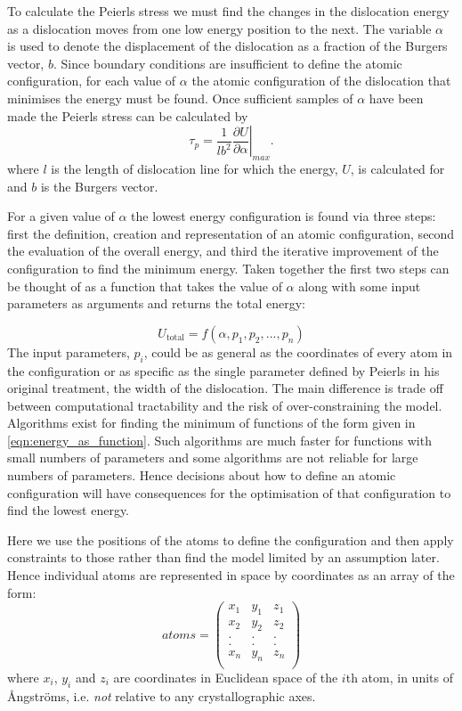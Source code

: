 To calculate the Peierls stress we must find the changes in the dislocation energy as a dislocation moves from one low energy position to the next. The variable $\alpha$ is used to denote the  displacement of the dislocation as a fraction of the Burgers vector, $b$. Since boundary conditions are insufficient to define the atomic configuration, for each value of $\alpha$ the atomic configuration of the dislocation that minimises the energy must be found. Once sufficient samples of $\alpha$ have been made the Peierls stress can be calculated by 
\begin{equation}
\tau_p = \frac{1}{lb^2}   \left. \frac{\partial U}{\partial \alpha} \right|_{max} .
\end{equation}
where $l$ is the length of dislocation line for which the energy, $U$, is calculated for and $b$ is the Burgers vector.

For a given value of $\alpha$ the lowest energy configuration is found via three steps: first the definition, creation and representation of an atomic configuration, second the evaluation of the overall energy, and third the iterative improvement of the configuration to find the minimum energy. Taken together the first two steps can be thought of as a function that takes the value of $\alpha$ along with some input parameters as arguments and returns the total energy:

\begin{equation}
U_{\text{total}} = f(\alpha, p_1, p_2,...,p_n )
\label{eqn:energy_as_function}
\end{equation}
The input parameters, $p_i$, could be as general as the coordinates of every atom in the configuration or as specific as the single parameter defined by Peierls in his original treatment, the width of the dislocation. The main difference is trade off between computational tractability and the risk of over-constraining the model. Algorithms exist for finding the minimum of functions of the form given in \autoref{eqn:energy_as_function}. Such algorithms are much faster for functions with small numbers of parameters and some algorithms are not reliable for large numbers of parameters. Hence decisions about how to define an atomic configuration will have consequences for the optimisation of that configuration to find the lowest energy.

Here we use the positions of the atoms to define the configuration and then apply constraints to those rather than find the model limited by an assumption later. Hence individual atoms are represented in space by coordinates as an array of the form:
$$ atoms = \begin{pmatrix}
x_1 & y_1 & z_1  \\
x_2 & y_2 & z_2  \\
.   &.    &.     \\
.   &.    &.     \\
x_n & y_n & z_n  \\
\end{pmatrix}
$$
where $x_i$, $y_i$ and $z_i$ are coordinates in Euclidean space of the $i$th atom, in units of \r{A}ngstr\"{o}ms, i.e. \emph{not} relative to any crystallographic axes.

